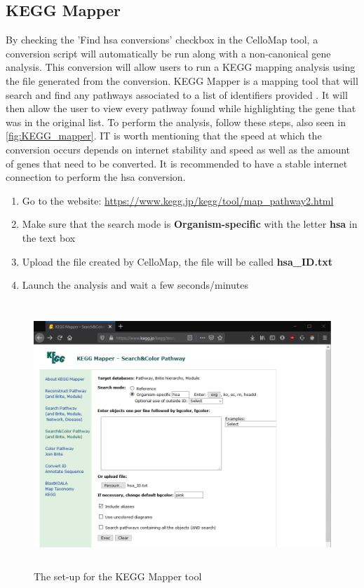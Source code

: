 \documentclass[11pt]{article}
\begin{document}
\subsection{KEGG Mapper \label{KEGG Map}}
By checking the 'Find hsa conversions' checkbox in the CelloMap tool, a conversion script will automatically be run along with a non-canonical gene analysis. This conversion will allow users to run a KEGG mapping analysis using the file generated from the conversion.
KEGG Mapper is a mapping tool that will search and find any pathways associated to a list of identifiers provided \cite{kanehisa2019kegg}. It will then allow the user to view every pathway found while highlighting the gene that was in the original list.
To perform the analysis, follow these steps, also seen in \autoref{fig:KEGG_mapper}.
IT is worth mentioning that the speed at which the conversion occurs depends on internet stability and speed as well as the amount of genes that need to be converted. It is recommended to have a stable internet connection to perform the hsa conversion.
\begin{enumerate}
\item Go to the website: \url{https://www.kegg.jp/kegg/tool/map_pathway2.html}
\item Make sure that the search mode is \textbf{Organism-specific} with the letter \textbf{hsa} in the text box
\item Upload the file created by CelloMap, the file will be called \textbf{hsa\_ID.txt} 
\item Launch the analysis and wait a few seconds/minutes
\end{enumerate}

\begin{figure}[h!]
\centering
\includegraphics[width=15cm,height=10cm,keepaspectratio]{KEGG_Mapper.png}
\caption{The set-up for the KEGG Mapper tool}
\label{fig:KEGG_mapper}
\end{figure}
\end{document}
